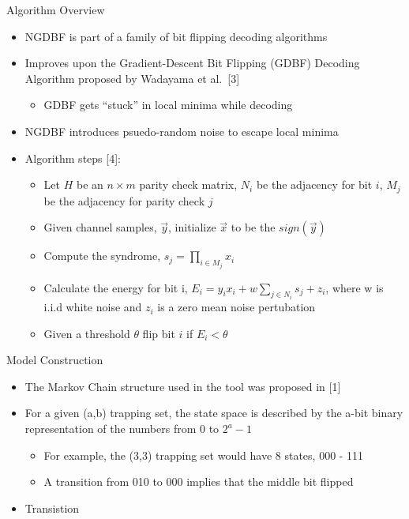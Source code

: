 \documentclass[10pt,ignorenonframetext,]{beamer}
\providecommand{\tightlist}{%
  \setlength{\itemsep}{0pt}\setlength{\parskip}{0pt}}
\begin{document}
\begin{frame}{Algorithm Overview}
\protect\hypertarget{algorithm-overview}{}
\begin{itemize}[<+->]
\tightlist
\item
  NGDBF is part of a family of bit flipping decoding algorithms
\item
  Improves upon the Gradient-Descent Bit Flipping (GDBF) Decoding
  Algorithm proposed by Wadayama et al.~{[}3{]}

  \begin{itemize}[<+->]
  \tightlist
  \item
    GDBF gets ``stuck'' in local minima while decoding
  \end{itemize}
\item
  NGDBF introduces psuedo-random noise to escape local minima
\item
  Algorithm steps {[}4{]}:

  \begin{itemize}[<+->]
  \tightlist
  \item
    Let \(H\) be an \(n\times m\) parity check matrix, \(N_i\) be the
    adjacency for bit \(i\), \(M_j\) be the adjacency for parity check
    \(j\)
  \item
    Given channel samples, \(\vec{y}\), initialize \(\vec{x}\) to be the
    \(sign(\vec{y})\)
  \item
    Compute the syndrome, \(s_j = \prod_{i\in M_j}x_i\)
  \item
    Calculate the energy for bit i,
    \(E_i = y_ix_i+w\sum_{j\in N_i}s_j + z_i\), where w is i.i.d white
    noise and \(z_i\) is a zero mean noise pertubation
  \item
    Given a threshold \(\theta\) flip bit \(i\) if \(E_i < \theta\)
  \end{itemize}
\end{itemize}
\end{frame}

\begin{frame}{Model Construction}
\protect\hypertarget{model-construction}{}
\begin{itemize}[<+->]
\tightlist
\item
  The Markov Chain structure used in the tool was proposed in {[}1{]}
\item
  For a given (a,b) trapping set, the state space is described by the
  a-bit binary representation of the numbers from 0 to \(2^a-1\)

  \begin{itemize}[<+->]
  \tightlist
  \item
    For example, the (3,3) trapping set would have 8 states, 000 - 111
  \item
    A transition from 010 to 000 implies that the middle bit flipped
  \end{itemize}
\item
  Transistion
\end{itemize}
\end{frame}
\end{document}
